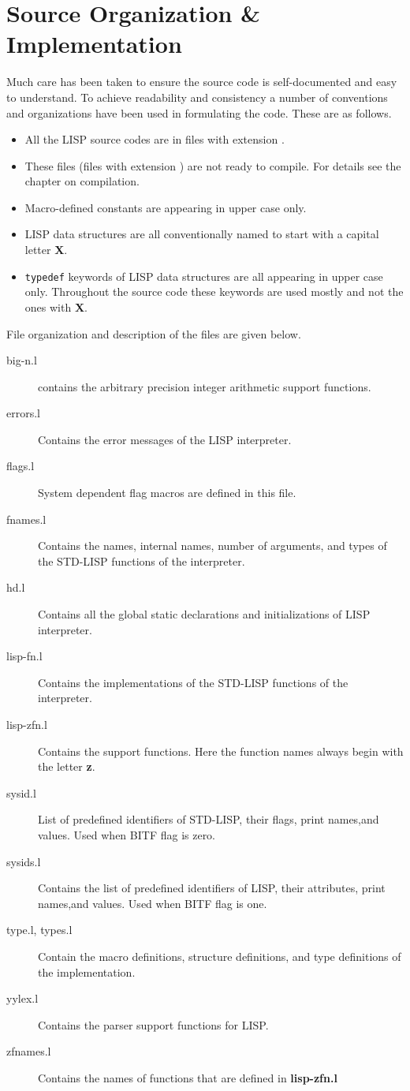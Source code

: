\section{Source Organization \& Implementation}
Much care has been taken to ensure the source code is self-documented and
easy to understand. To achieve readability and consistency a number of
conventions and organizations have been used in formulating the code.
These are as follows.
\begin{itemize}
  \item All the LISP source codes are in files with extension .
  \item These files (files with extension ) are not ready to compile.
         For details see the chapter on compilation.
  \item Macro-defined constants are appearing in upper case only.
  \item LISP data  structures  are  all  conventionally named to start
        with a capital letter {\bf X}.
  \item {\tt typedef} keywords of LISP data  structures  are  all
        appearing in upper case only. Throughout the source code
        these keywords are used mostly and not the ones with {\bf X}.
\end{itemize}
File organization and description of the files are given below.
\begin{description}
  \item[big-n.l] contains the arbitrary precision integer arithmetic
     support functions.
  \item[errors.l] Contains the error messages of the LISP interpreter.
  \item[flags.l] System dependent flag macros are defined in this file.
  \item[fnames.l] Contains the names, internal names, number of arguments,
     and types of the STD-LISP functions of the interpreter.
  \item[hd.l] Contains all the global static declarations and initializations
     of LISP interpreter.
  \item[lisp-fn.l] Contains the implementations of the STD-LISP functions
     of the interpreter.
  \item[lisp-zfn.l] Contains the  support functions.
  Here the function names   always begin with the  letter {\bf z}.
  \item[sysid.l] List of predefined identifiers of STD-LISP,
     their flags, print
     names,and values. Used when BITF flag is zero.
  \item[sysids.l] Contains the list of predefined identifiers of LISP,
     their attributes, print names,and values. Used when BITF flag is one.
  \item[type.l, types.l] Contain the macro definitions, structure
     definitions, and type definitions of the implementation.
  \item[yylex.l] Contains the parser support functions for LISP.
  \item[zfnames.l] Contains the names of functions that are defined in
      {\bf lisp-zfn.l}
\end{description}
